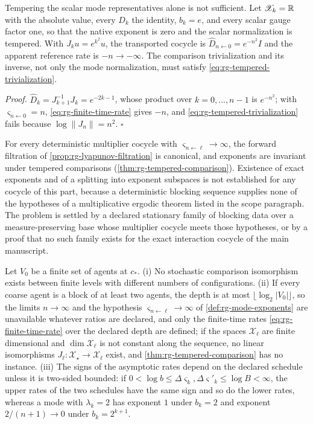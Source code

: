 Tempering the scalar mode representatives alone is not sufficient. Let
\(\mathscr X_k=\mathbb R\) with the absolute value, every \(D_k\) the identity, \(b_k=e\), and
every scalar gauge factor one, so that the native exponent is zero and the
scalar normalization is tempered. With \(J_ku=e^{k^2}u\), the transported
cocycle is \(\widehat D_{n\leftarrow0}=e^{-n^2}I\) and the apparent reference
rate is \(-n\to-\infty\). The comparison trivialization and its inverse, not
only the mode normalization, must satisfy
\eqref{eq:rg-tempered-trivialization}. 

\noindent\emph{Proof.}
\(\widehat D_k=J_{k+1}^{-1}J_k=e^{-2k-1}\), whose product over
\(k=0,\ldots,n-1\) is \(e^{-n^2}\); with \(\varsigma_{n\leftarrow0}=n\),
\eqref{eq:rg-finite-time-rate} gives \(-n\), and
\eqref{eq:rg-tempered-trivialization} fails because
\(\log\lVert J_n\rVert=n^2\). \(\square\)

For every deterministic multiplier cocycle with
\(\varsigma_{n\leftarrow\ell}\to\infty\), the forward filtration of
\cref{prop:rg-lyapunov-filtration} is canonical, and exponents are invariant
under tempered comparisons (\cref{thm:rg-tempered-comparison}). Existence of
exact exponents and of a splitting into exponent subspaces is not established
for any cocycle of this part, because a deterministic blocking sequence
supplies none of the hypotheses of a multiplicative ergodic theorem listed in
the scope paragraph. The problem is settled by a declared stationary family of
blocking data over a measure-preserving base whose multiplier cocycle meets
those hypotheses, or by a proof that no such family exists for the exact
interaction cocycle of the main manuscript.

Let \(V_0\) be a finite set of agents at \(c_*\). (i) No stochastic comparison
isomorphism exists between finite levels with different numbers of
configurations. (ii) If every coarse
agent is a block of at least two agents, the depth is at most
\(\lfloor\log_2\lvert V_0\rvert\rfloor\), so the limits \(n\to\infty\) and
the hypothesis \(\varsigma_{n\leftarrow\ell}\to\infty\) of
\cref{def:rg-mode-exponents} are unavailable whatever ratios are declared,
and only the finite-time rates \eqref{eq:rg-finite-time-rate} over the
declared depth are defined; if the spaces \(\mathscr X_\ell\) are finite dimensional
and \(\dim \mathscr X_\ell\) is not constant along the sequence, no linear isomorphisms
\(J_\ell:\mathscr X_\star\to \mathscr X_\ell\) exist, and \cref{thm:rg-tempered-comparison} has
no instance. (iii) The signs of the asymptotic rates depend on the declared
schedule unless it is two-sided bounded: if
\(0<\log b\leq\Delta\varsigma_k,\Delta\varsigma'_k\leq\log B<\infty\), the
upper rates of the two schedules have the same sign and so do the lower
rates, whereas a mode with \(\lambda_k=2\) has exponent \(1\) under
\(b_k=2\) and exponent \(2/(n+1)\to0\) under \(b_k=2^{k+1}\).

